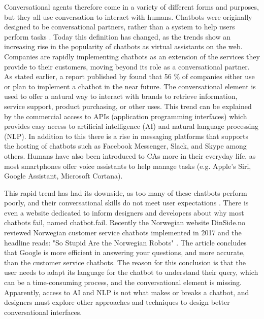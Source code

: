 Conversational agents therefore come in a variety of different forms and purposes, but they all use conversation to interact with humans. Chatbots were originally designed to be conversational partners, rather than a system to help users perform tasks \citep{McTear2016}. Today this definition has changed, as the trends show an increasing rise in the popularity of chatbots as virtual assistants on the web. Companies are rapidly implementing chatbots as an extension of the services they provide to their customers, moving beyond its role as a conversational partner. As stated earlier, a report published by \cite{forrester2017} found that 56 \% of companies either use or plan to implement a chatbot in the near future. The conversational element is used to offer a natural way to interact with brands to retrieve information, service support, product purchasing, or other uses. This trend can be explained by the commercial access to APIs (application programming interfaces) which provides easy access to artificial intelligence (AI) and natural language processing (NLP). In addition to this there is a rise in messaging platforms that supports the hosting of chatbots such as Facebook Messenger, Slack, and Skype among others. Humans have also been introduced to CAs more in their everyday life, as most smartphones offer voice assistants to help manage tasks (e.g. Apple's Siri, Google Assistant, Microsoft Cortana).

This rapid trend has had its downside, as too many of these chatbots perform poorly, and their conversational skills do not meet user expectations \citep{stokke2017,boutin2017}. There is even a website dedicated to inform designers and developers about why most chatbots fail, named chatbot.fail. Recently the Norwegian website DinSide.no reviewed Norwegian customer service chatbots implemented in 2017 and the headline reads: "So Stupid Are the Norwegian Robots" \cite{stokke2017}. The article concludes that Google is more efficient in answering your questions, and more accurate, than the customer service chatbots. The reason for this conclusion is that the user needs to adapt its language for the chatbot to understand their query, which can be a time-consuming process, and the conversational element is missing. Apparently, access to AI and NLP is not what makes or breaks a chatbot, and designers must explore other approaches and techniques to design better conversational interfaces.

\vspace{5mm} %


